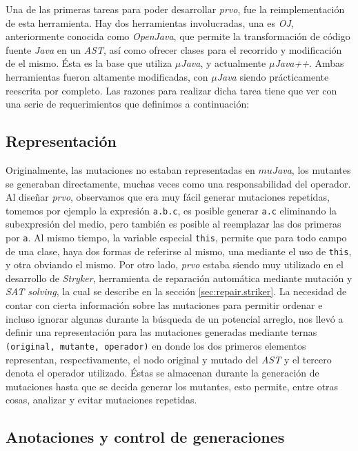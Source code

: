 Una de las primeras tareas para poder desarrollar \emph{prvo}, fue la reimplementaci\'on de esta herramienta. Hay dos herramientas involucradas, una es \emph{OJ}, anteriormente conocida como \emph{OpenJava}, que permite la transformaci\'on de c\'odigo fuente \emph{Java} en un \emph{AST}, as\'i como ofrecer clases para el recorrido y modificaci\'on de el mismo. \'Esta es la base que utiliza \emph{$\mu$Java}, y actualmente \emph{$\mu$Java++}. Ambas herramientas fueron altamente modificadas, con \emph{$\mu$Java} siendo pr\'acticamente reescrita por completo. Las razones para realizar dicha tarea tiene que ver con una serie de requerimientos que definimos a continuaci\'on:

\subsection{Representaci\'on}

Originalmente, las mutaciones no estaban representadas en \emph{$mu$Java}, los mutantes se generaban directamente, muchas veces como una responsabilidad del operador. Al dise\~nar \emph{prvo}, observamos que era muy f\'acil generar mutaciones repetidas, tomemos por ejemplo la expresi\'on \lstinline|a.b.c|, es posible generar \lstinline|a.c| eliminando la subexpresi\'on del medio, pero tambi\'en es posible al reemplazar las dos primeras por \lstinline|a|. Al mismo tiempo, la variable especial \lstinline|this|, permite que para todo campo de una clase, haya dos formas de referirse al mismo, una mediante el uso de \lstinline|this|, y otra obviando el mismo. Por otro lado, \emph{prvo} estaba siendo muy utilizado en el desarrollo de \emph{Stryker}, herramienta de reparaci\'on autom\'atica mediante mutaci\'on y \emph{SAT solving}, la cual se describe en la secci\'on \ref{sec:repair.striker}. La necesidad de contar con cierta informaci\'on sobre las mutaciones para permitir ordenar e incluso ignorar algunas durante la b\'usqueda de un potencial arreglo, nos llev\'o a definir una representaci\'on para las mutaciones generadas mediante ternas \texttt{(original, mutante, operador)} en donde los dos primeros elementos representan, respectivamente, el nodo original y mutado del \emph{AST} y el tercero denota el operador utilizado. \'Estas se almacenan durante la generaci\'on de mutaciones hasta que se decida generar los mutantes, esto permite, entre otras cosas, analizar y evitar mutaciones repetidas.

\subsection{Anotaciones y control de generaciones}

